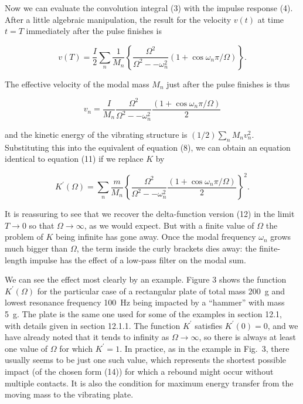 
  Now we can evaluate the convolution integral (3) with the impulse response 
  (4). After a little algebraic manipulation, the result for the velocity 
  $v(t)$ at time $t=T$ immediately after the pulse finishes is 

  \begin{equation*}v(T)=\dfrac{I}{2} \sum_n{\dfrac{1}{M_n} \left\lbrace 
  \dfrac{\Omega^2}{\Omega^2 -- \omega_n^2} (1 + \cos \omega_n \pi/\Omega) 
  \right\rbrace} . \tag{17}\end{equation*} 

  The effective velocity of the modal mass $M_n$ just after the pulse finishes 
  is thus 

  \begin{equation*}v_n=\dfrac{I}{M_n} \dfrac{\Omega^2}{\Omega^2 -- \omega_n^2} 
  \dfrac{(1 + \cos \omega_n \pi/\Omega)}{2} \tag{18}\end{equation*} 

  \noindent{}and the kinetic energy of the vibrating structure is 
  $(1/2)\sum_n{M_n v_n^2}$. Substituting this into the equivalent of equation 
  (8), we can obtain an equation identical to equation (11) if we replace $K$ 
  by 

  \begin{equation*}K^\prime (\Omega) = \sum_n{\dfrac{m}{M_n} \left\lbrace 
  \dfrac{\Omega^2}{\Omega^2 -- \omega_n^2} \dfrac{(1 + \cos \omega_n 
  \pi/\Omega)}{2} \right\rbrace^2} . \tag{19}\end{equation*} 

  It is reassuring to see that we recover the delta-function version (12) in 
  the limit $T \rightarrow 0$ so that $\Omega \rightarrow\infty$, as we would 
  expect. But with a finite value of $\Omega$ the problem of $K$ being infinite 
  has gone away. Once the modal frequency $\omega_n$ grows much bigger than 
  $\Omega$, the term inside the curly brackets dies away: the finite-length 
  impulse has the effect of a low-pass filter on the modal sum. 

  We can see the effect most clearly by an example. Figure 3 shows the function 
  $K^\prime(\Omega)$ for the particular case of a rectangular plate of total 
  mass 200~g and lowest resonance frequency 100~Hz being impacted by a 
  ``hammer'' with mass 5~g. The plate is the same one used for some of the 
  examples in section 12.1, with details given in section 12.1.1. The function 
  $K^\prime$ satisfies $K^\prime(0)=0$, and we have already noted that it tends 
  to infinity as $\Omega \rightarrow \infty$, so there is always at least one 
  value of $\Omega$ for which $K^\prime=1$. In practice, as in the example in 
  Fig.\ 3, there usually seems to be just one such value, which represents the 
  shortest possible impact (of the chosen form (14)) for which a rebound might 
  occur without multiple contacts. It is also the condition for maximum energy 
  transfer from the moving mass to the vibrating plate. 

